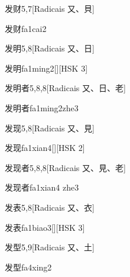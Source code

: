 \begin{entry}{发财}{5,7}[Radicais ⼜、⾙]
  \begin{phonetics}{发财}{fa1cai2}
  \end{phonetics}
\end{entry}

\begin{entry}{发明}{5,8}[Radicais ⼜、⽇]
  \begin{phonetics}{发明}{fa1ming2}[][HSK 3]
  \end{phonetics}
\end{entry}

\begin{entry}{发明者}{5,8,8}[Radicais ⼜、⽇、⽼]
  \begin{phonetics}{发明者}{fa1ming2zhe3}
  \end{phonetics}
\end{entry}

\begin{entry}{发现}{5,8}[Radicais ⼜、⾒]
  \begin{phonetics}{发现}{fa1xian4}[][HSK 2]
  \end{phonetics}
\end{entry}

\begin{entry}{发现者}{5,8,8}[Radicais ⼜、⾒、⽼]
  \begin{phonetics}{发现者}{fa1xian4 zhe3}
  \end{phonetics}
\end{entry}

\begin{entry}{发表}{5,8}[Radicais ⼜、⾐]
  \begin{phonetics}{发表}{fa1biao3}[][HSK 3]
  \end{phonetics}
\end{entry}

\begin{entry}{发型}{5,9}[Radicais ⼜、⼟]
  \begin{phonetics}{发型}{fa4xing2}
  \end{phonetics}
\end{entry}

